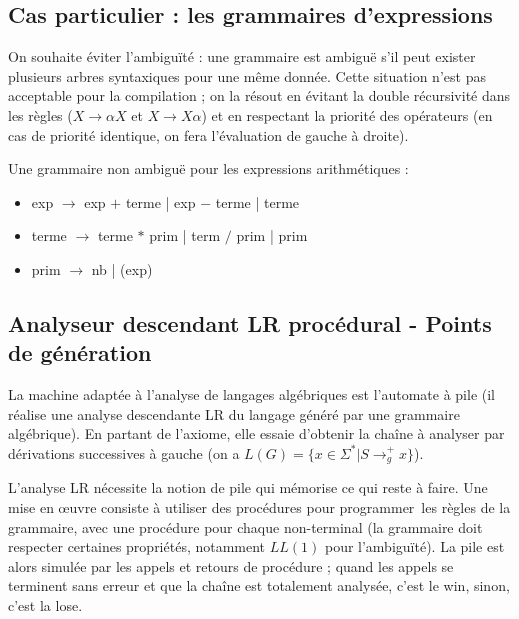 \documentclass[a4paper]{article}
\begin{document}
\subsection{Cas particulier : les grammaires d'expressions}

On souhaite éviter l'ambiguïté : une grammaire est ambiguë s'il peut exister plusieurs arbres syntaxiques pour une même donnée. Cette situation n'est pas acceptable pour la compilation ; on la résout en évitant la double récursivité dans les règles ($X \rightarrow \alpha X$ et $X \rightarrow X \alpha$) et en respectant la priorité des opérateurs (en cas de priorité identique, on fera l'évaluation de gauche à droite).

\begin{ex}
Une grammaire non ambiguë pour les expressions arithmétiques :\begin{itemize}
\item[ ] exp $\rightarrow$ exp $+$ terme | exp $-$ terme | terme
\item[ ] terme $\rightarrow$ terme $*$ prim | term $/$ prim | prim
\item[ ] prim $\rightarrow$ nb | (exp)\end{itemize}
\end{ex}

\subsection{Analyseur descendant LR procédural - Points de génération}

La machine adaptée à l'analyse de langages algébriques est l'automate à pile (il réalise une analyse descendante LR du langage généré par une grammaire algébrique). En partant de l'axiome, elle essaie d'obtenir la chaîne à analyser par dérivations successives à gauche (on a $L(G)=\{x\in\Sigma^*|S\rightarrow^+_gx\}$).

L'analyse LR nécessite la notion de pile qui mémorise ce qui reste à faire. Une mise en \oe uvre consiste à utiliser des procédures pour \og programmer\fg\ les règles de la grammaire, avec une procédure pour chaque non-terminal (la grammaire doit respecter certaines propriétés, notamment $LL(1)$ pour l'ambiguïté). La pile est alors simulée par les appels et retours de procédure ; quand les appels se terminent sans erreur et que la chaîne est totalement analysée, c'est le win, sinon, c'est la lose.
\end{document}
